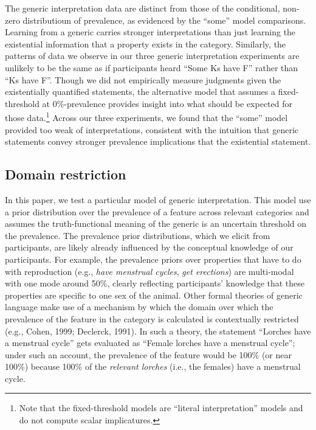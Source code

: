 \documentclass[,man,floatsintext]{apa6}
\let\rmarkdownfootnote\footnote%
\def\footnote{\protect\rmarkdownfootnote}
\theoremstyle{definition}
\theoremstyle{definition}
\theoremstyle{definition}
\theoremstyle{remark}
\begin{document}
The generic interpretation data are distinct from those of the
conditional, non-zero distributioun of prevalence, as evidenced by the
\enquote{some} model comparisons. Learning from a generic carries
stronger interpretations than just learning the existential information
that a property exists in the category. Similarly, the patterns of data
we observe in our three generic interpretation experiments are unlikely
to be the same as if participants heard \enquote{Some Ks have F} rather
than \enquote{Ks have F}. Though we did not empirically measure
judgments given the existentially quantified statements, the alternative
model that assumes a fixed-threshold at 0\%-prevalence provides insight
into what should be expected for those data.\footnote{Note that the
  fixed-threshold models are \enquote{literal interpretation} models and
  do not compute scalar implicatures.} Across our three experiments, we
found that the \enquote{some} model provided too weak of
interpretations, consistent with the intuition that generic statements
convey stronger prevalence implications that the existential statement.


\subsection{Domain restriction}\label{domain-restriction}

In this paper, we test a particular model of generic interpretation.
This model use a prior distribution over the prevalence of a feature
across relevant categories and assumes the truth-functional meaning of
the generic is an uncertain threshold on the prevalence. The prevalence
prior distributions, which we elicit from participants, are likely
already influenced by the conceptual knowledge of our participants. For
example, the prevalence priors over properties that have to do with
reproduction (e.g., \emph{have menstrual cycles}, \emph{get erections})
are multi-modal with one mode around 50\%, clearly reflecting
participants' knowledge that these properties are specific to one sex of
the animal. Other formal theories of generic language make use of a
mechanism by which the domain over which the prevalence of the feature
in the category is calculated is contextually restricted (e.g., Cohen,
1999; Declerck, 1991). In such a theory, the statement \enquote{Lorches
have a menstrual cycle} gets evaluated as \enquote{Female lorches have a
menstrual cycle}; under such an account, the prevalence of the feature
would be 100\% (or near 100\%) because 100\% of the \emph{relevant
lorches} (i.e., the females) have a menstrual cycle.
\end{document}

